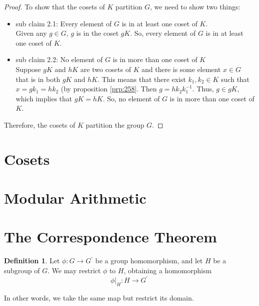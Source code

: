\documentclass[
]{book}
\theoremstyle{definition}
\newtheorem{definition}{Definition}[chapter]
\theoremstyle{definition}
\theoremstyle{definition}
\theoremstyle{definition}
\theoremstyle{remark}
\begin{document}
\begin{proof}
To show that the cosets of \(K\) partition \(G\), we need to show two things:

\begin{itemize}
\item
  sub claim 2.1: Every element of \(G\) is in at least one coset of \(K\).\\
  Given any \(g \in G\), \(g\) is in the coset \(gK\). So, every element of \(G\) is in at least one coset of \(K\).
\item
  sub claim 2.2: No element of \(G\) is in more than one coset of \(K\)\\
  Suppose \(gK\) and \(hK\) are two cosets of \(K\) and there is some element \(x \in G\) that is in both \(gK\) and \(hK\). This means that there exist \(k_1, k_2 \in K\) such that \(x = gk_1 = hk_2\) (by proposition \ref{prp:258}. Then \(g = hk_2k_1^{-1}\). Thus, \(g\in gK\), which implies that \(gK = hK\).
  So, no element of \(G\) is in more than one coset of \(K\).
\end{itemize}

Therefore, the cosets of \(K\) partition the group \(G\).
\end{proof}

\hypertarget{cosets}{%
\section{Cosets}\label{cosets}}

\hypertarget{modular-arithmetic}{%
\section{Modular Arithmetic}\label{modular-arithmetic}}

\hypertarget{the-correspondence-theorem}{%
\section{The Correspondence Theorem}\label{the-correspondence-theorem}}

\begin{definition}
\protect\hypertarget{def:unnamed-chunk-44}{}\label{def:unnamed-chunk-44}Let \(\phi: G \rightarrow G^\prime\) be a group homomorphism, and let \(H\) be a subgroup of \(G\). We may restrict \(\phi\) to \(H\), obtaining a homomorphism
\[\phi|_H: H \rightarrow G^\prime\]
\end{definition}

In other words, we take the same map but restrict its domain.
\end{document}
